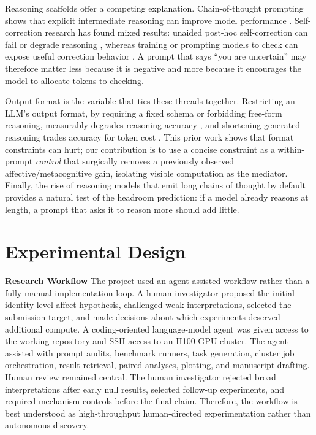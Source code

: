 \documentclass{article}
\begin{document}
Reasoning scaffolds offer a competing explanation. Chain-of-thought prompting shows that explicit intermediate reasoning can improve model performance \citep{wei2022chain}. Self-correction research has found mixed results: unaided post-hoc self-correction can fail or degrade reasoning \citep{huang2023cannot}, whereas training or prompting models to check can expose useful correction behavior \citep{zhang2024learning}. A prompt that says ``you are uncertain'' may therefore matter less because it is negative and more because it encourages the model to allocate tokens to checking.

Output format is the variable that ties these threads together. Restricting an LLM's output format, by requiring a fixed schema or forbidding free-form reasoning, measurably degrades reasoning accuracy \citep{tam2024letmespeak}, and shortening generated reasoning trades accuracy for token cost \citep{nayab2024concise}. This prior work shows that format constraints can hurt; our contribution is to use a concise constraint as a within-prompt \emph{control} that surgically removes a previously observed affective/metacognitive gain, isolating visible computation as the mediator. Finally, the rise of reasoning models that emit long chains of thought by default \citep{deepseekai2025r1,yang2025qwen3} provides a natural test of the headroom prediction: if a model already reasons at length, a prompt that asks it to reason more should add little.


\section{Experimental Design}


\noindent \par{\textbf{Research Workflow}}
The project used an agent-assisted workflow rather than a fully manual implementation loop. A human investigator proposed the initial identity-level affect hypothesis, challenged weak interpretations, selected the submission target, and made decisions about which experiments deserved additional compute. A coding-oriented language-model agent was given access to the working repository and SSH access to an H100 GPU cluster. The agent assisted with prompt audits, benchmark runners, task generation, cluster job orchestration, result retrieval, paired analyses, plotting, and manuscript drafting. Human review remained central. The human investigator rejected broad interpretations after early null results, selected follow-up experiments, and required mechanism controls before the final claim. Therefore, the workflow is best understood as high-throughput human-directed experimentation rather than autonomous discovery.
\end{document}
